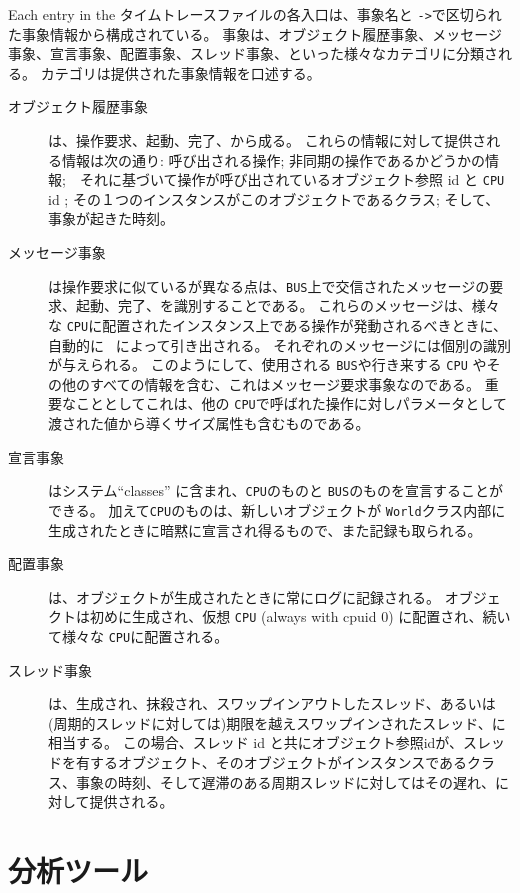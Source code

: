 \documentclass[\pformat,12pt]{jreport}
\begin{document}
Each entry in the タイムトレースファイルの各入口は、事象名と \texttt{->}で区切られた事象情報から構成されている。
事象は、オブジェクト履歴事象、メッセージ事象、宣言事象、配置事象、スレッド事象、といった様々なカテゴリに分類される。
カテゴリは提供された事象情報を口述する。

\begin{description}
\item[オブジェクト履歴事象] は、操作要求、起動、完了、から成る。
これらの情報に対して提供される情報は次の通り: 呼び出される操作; 非同期の操作であるかどうかの情報;　それに基づいて操作が呼び出されているオブジェクト参照 id と \texttt{CPU} id ; その１つのインスタンスがこのオブジェクトであるクラス; そして、事象が起きた時刻。
\item[メッセージ事象] は操作要求に似ているが異なる点は、\texttt{BUS}上で交信されたメッセージの要求、起動、完了、を識別することである。
これらのメッセージは、様々な \texttt{CPU}に配置されたインスタンス上である操作が発動されるべきときに、自動的に \VDMTools\ によって引き出される。
それぞれのメッセージには個別の識別が与えられる。
このようにして、使用される \texttt{BUS}や行き来する \texttt{CPU} やその他のすべての情報を含む、これはメッセージ要求事象なのである。
重要なこととしてこれは、他の \texttt{CPU}で呼ばれた操作に対しパラメータとして渡された値から導くサイズ属性も含むものである。
\item[宣言事象] はシステム``classes'' に含まれ、\texttt{CPU}のものと \texttt{BUS}のものを宣言することができる。
加えて\texttt{CPU}のものは、新しいオブジェクトが \texttt{World}クラス内部に生成されたときに暗黙に宣言され得るもので、また記録も取られる。
\item[配置事象] は、オブジェクトが生成されたときに常にログに記録される。
    オブジェクトは初めに生成され、仮想 \texttt{CPU} (always with cpuid 0) に配置され、続いて様々な \texttt{CPU}に配置される。
\item[スレッド事象] は、生成され、抹殺され、スワップインアウトしたスレッド、あるいは(周期的スレッドに対しては)期限を越えスワップインされたスレッド、に相当する。
この場合、スレッド id と共にオブジェクト参照idが、スレッドを有するオブジェクト、そのオブジェクトがインスタンスであるクラス、事象の時刻、そして遅滞のある周期スレッドに対してはその遅れ、に対して提供される。
\end{description}

\section{分析ツール}
\end{document}

